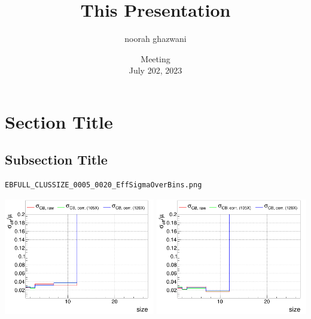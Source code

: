 \documentclass[aspectratio=169]{beamer}
\title{This Presentation}
\author{noorah ghazwani}
\date[Group Mtg. 2023-07-20]{Meeting\\July 202, 2023}
\institute[BU]{Baylor University}
\begin{document}
\maketitle

\section{Section Title}
\subsection{Subsection Title}

\begin{frame}[fragile]
\begin{verbatim}
EBFULL_CLUSSIZE_0005_0020_EffSigmaOverBins.png
\end{verbatim}
 \includegraphics[width=0.495\textwidth]{EBFULL_CLUSSIZE_0005_0020_EffSigmaOverBins.png}
 \includegraphics[width=0.495\textwidth]{EBFULL_CLUSSIZE_0005_0020_EffSigmaOverBins2.png}
\end{frame}



\end{document}
